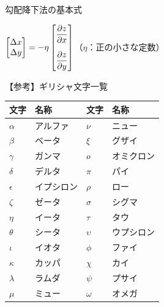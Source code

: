 \documentclass[dvipdfmx,aspectratio=169]{beamer}
\begin{document}
	\begin{frame}{勾配降下法の基本式}
		\begin{screen}
			$ \begin{bmatrix}
				\Delta x\\ \Delta y
			\end{bmatrix} = -\eta \begin{bmatrix}
				\dfrac{\partial z}{\partial x}\vspace{1em}\\ \dfrac{\partial z}{\partial y}
			\end{bmatrix} $（$ \eta $：正の小さな定数）
		\end{screen}
	\end{frame}


	\begin{frame}{【参考】ギリシャ文字一覧}
		\begin{table}[]
			\begin{tabular}{ll|ll}
				\toprule
				文字         & 名称    & 文字         & 名称    \\
				\midrule
				$\alpha$   & アルファ  & $\nu$      & ニュー   \\
				$\beta$    & ベータ   & $\xi$      & グザイ   \\
				$\gamma$   & ガンマ   & $o$        & オミクロン \\
				$\delta$   & デルタ   & $\pi$      & パイ    \\
				$\epsilon$ & イプシロン & $\rho$     & ロー    \\
				$\zeta$    & ゼータ   & $\sigma$   & シグマ   \\
				$\eta$     & イータ   & $\tau$     & タウ    \\
				$\theta$   & シータ   & $\upsilon$ & ウプシロン \\
				$\iota$     & イオタ   & $\phi$     & ファイ   \\
				$\kappa$   & カッパ   & $\chi$     & カイ    \\
				$\lambda$  & ラムダ   & $\psi$     & プサイ   \\
				$\mu$      & ミュー   & $\omega$   & オメガ  \\
				\bottomrule
			\end{tabular}
		\end{table}
	\end{frame}
\end{document}
